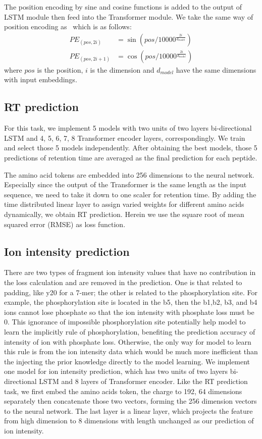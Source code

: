 The position encoding by sine and cosine functions is added to the output of LSTM module then feed into the Transformer module.
We take the same way of position encoding as~\cite{vaswani2017attention} which is as follows:
\begin{align*}
    PE_{(pos, 2i)} &= \sin{(pos/10000^{\frac{2i}{d_{model}}})} \\
    PE_{(pos, 2i+1)} &= \cos{(pos/10000^{\frac{2i}{d_{model}}})}
\end{align*}
where $pos$  is the position, $i$ is the dimension and $d_{model}$ have the same dimensions with input embeddings.

\subsection{RT prediction}

For this task, we implement
5 models with two units of two layers bi-directional LSTM and 4, 5, 6, 7, 8 Transformer encoder layers, correspondingly. We train and select those 5 models independently. After obtaining the best models, those 5 predictions of retention time are averaged as the final prediction for each peptide.

The amino acid tokens are embedded into 256 dimensions to the neural network.
Especially since the output of the Transformer is the same length as the input sequence, we need to take it down to one scaler for retention time. By adding the time distributed linear layer to assign varied weights for different amino acids dynamically, we obtain RT prediction.
Herein we use the square root of mean squared error (RMSE) as loss function.

\subsection{Ion intensity prediction}

There are two types of fragment ion intensity values that have no contribution in the loss calculation and are removed in the prediction. One is that related to padding, like y20 for a 7-mer; the other is related to the phosphorylation site. For example, the phosphorylation site is located in the b5, then the b1,b2, b3, and b4 ions cannot lose phosphate so that the ion intensity with phosphate loss must be 0. This ignorance of impossible phosphorylation site potentially help model to learn the implicitly rule of phosphorylation, benefiting the prediction accuracy of intensity of ion with phosphate loss. Otherwise, the only way for model to learn this rule is from the ion intensity data which would be much more inefficient than the injecting the prior knowledge directly to the model learning.
We implement one model for ion intensity prediction, which has two units of two layers bi-directional LSTM and 8 layers of Transformer encoder. Like the RT prediction task, we first embed the amino acids token, the charge to 192, 64 dimensions separately then concatenate those two vectors, forming the 256 dimension vectors to the neural network. The last layer is a linear layer, which projects the feature from high dimension to 8 dimensions with length unchanged as our prediction of ion intensity.

